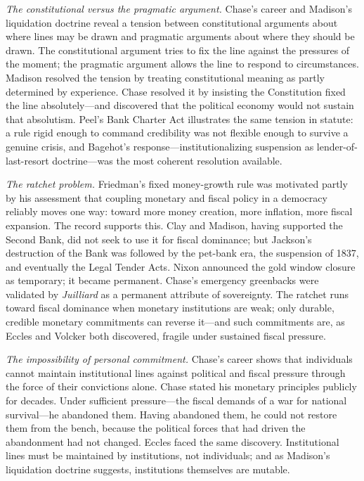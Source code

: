 \documentclass[12pt]{article}
\begin{document}
\textit{The constitutional versus the pragmatic argument.}  Chase's
career and Madison's liquidation doctrine reveal a tension between
constitutional arguments about where lines may be drawn and pragmatic
arguments about where they should be drawn.  The constitutional argument
tries to fix the line against the pressures of the moment; the pragmatic
argument allows the line to respond to circumstances.  Madison resolved
the tension by treating constitutional meaning as partly determined by
experience.  Chase resolved it by insisting the Constitution fixed the
line absolutely---and discovered that the political economy would not
sustain that absolutism.  Peel's Bank Charter Act illustrates the same
tension in statute: a rule rigid enough to command credibility was not
flexible enough to survive a genuine crisis, and Bagehot's
response---institutionalizing suspension as lender-of-last-resort
doctrine---was the most coherent resolution available.

\textit{The ratchet problem.}  Friedman's fixed money-growth rule was
motivated partly by his assessment that coupling monetary and fiscal
policy in a democracy reliably moves one way: toward more money
creation, more inflation, more fiscal expansion.  The record supports
this.  Clay and Madison, having supported the Second Bank, did not
seek to use it for fiscal dominance; but Jackson's destruction of the
Bank was followed by the pet-bank era, the suspension of 1837, and
eventually the Legal Tender Acts.  Nixon announced the gold window
closure as temporary; it became permanent.  Chase's emergency greenbacks
were validated by \textit{Juilliard} as a permanent attribute of
sovereignty.  The ratchet runs toward fiscal dominance when monetary
institutions are weak; only durable, credible monetary commitments can
reverse it---and such commitments are, as Eccles and Volcker both
discovered, fragile under sustained fiscal pressure.

\textit{The impossibility of personal commitment.}  Chase's career shows
that individuals cannot maintain institutional lines against political
and fiscal pressure through the force of their convictions alone.
Chase stated his monetary principles publicly for decades.  Under
sufficient pressure---the fiscal demands of a war for national
survival---he abandoned them.  Having abandoned them, he could not
restore them from the bench, because the political forces that had
driven the abandonment had not changed.  Eccles faced the same
discovery.  Institutional lines must be maintained by institutions,
not individuals; and as Madison's liquidation doctrine suggests,
institutions themselves are mutable.
\end{document}
